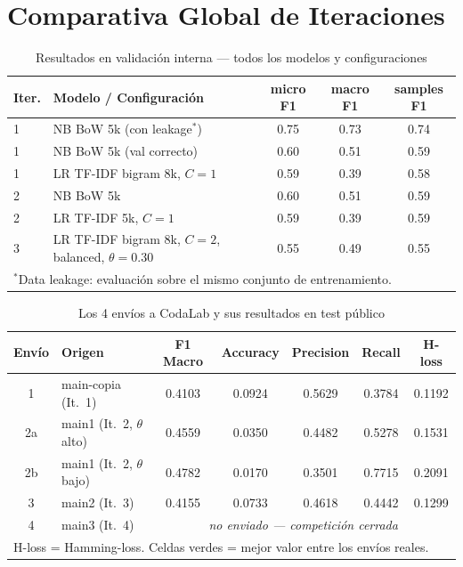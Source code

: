 \documentclass[11pt, a4paper]{article}
\begin{document}
\section{Comparativa Global de Iteraciones}

\begin{table}[H]
\centering
\caption{Resultados en validación interna --- todos los modelos y configuraciones}
\small
\begin{tabularx}{\textwidth}{lXccc}
\toprule
\textbf{Iter.} & \textbf{Modelo / Configuración} & \textbf{micro F1} & \textbf{macro F1} & \textbf{samples F1} \\
\midrule
1 & NB BoW 5k (con leakage$^*$) & 0.75 & 0.73 & 0.74 \\
1 & NB BoW 5k (val correcto)    & 0.60 & 0.51 & 0.59 \\
1 & LR TF-IDF bigram 8k, $C=1$  & 0.59 & 0.39 & 0.58 \\
\midrule
2 & NB BoW 5k                   & 0.60 & 0.51 & 0.59 \\
2 & LR TF-IDF 5k, $C=1$         & 0.59 & 0.39 & 0.59 \\
\midrule
3 & LR TF-IDF bigram 8k, $C=2$, balanced, $\theta=0.30$ & 0.55 & 0.49 & 0.55 \\
\bottomrule
\multicolumn{5}{p{\dimexpr\textwidth-2\tabcolsep}}{\small $^*$Data leakage: evaluación sobre el mismo conjunto de entrenamiento.}
\end{tabularx}
\end{table}

\begin{table}[H]
\centering
\caption{Los 4 envíos a CodaLab y sus resultados en test público}
\begin{tabular}{clccccc}
\toprule
\textbf{Envío} & \textbf{Origen} & \textbf{F1 Macro} & \textbf{Accuracy} & \textbf{Precision} & \textbf{Recall} & \textbf{H-loss} \\
\midrule
1  & main-copia (It.~1)          & 0.4103 & \cellcolor{bestcell}0.0924 & \cellcolor{bestcell}0.5629 & 0.3784 & \cellcolor{bestcell}0.1192 \\
2a & main1 (It.~2, $\theta$ alto) & 0.4559 & 0.0350 & 0.4482 & 0.5278 & 0.1531 \\
2b & main1 (It.~2, $\theta$ bajo) & \cellcolor{bestcell}0.4782 & 0.0170 & 0.3501 & \cellcolor{bestcell}0.7715 & 0.2091 \\
3  & main2 (It.~3)               & 0.4155 & 0.0733 & 0.4618 & 0.4442 & 0.1299 \\
4  & main3 (It.~4) & \multicolumn{5}{c}{\textit{no enviado --- competición cerrada}} \\
\bottomrule
\multicolumn{7}{l}{\small H-loss = Hamming-loss. Celdas verdes = mejor valor entre los envíos reales.}
\end{tabular}
\end{table}
\end{document}
